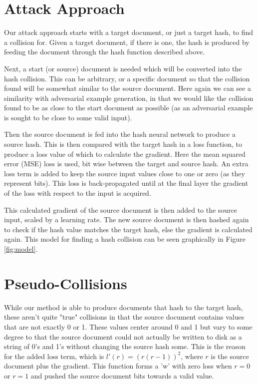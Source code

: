 \documentclass{article}
\begin{document}
\section{Attack Approach}

Our attack approach starts with a target document, or just a target hash, to
find a collision for. Given a target document, if there is one, the hash
is produced by feeding the document through the hash function described above.

Next, a start (or source) document is needed which will be converted into the
hash collision.  This can be arbitrary, or a specific document so that the
collision found will be somewhat similar to the source document. Here again we
can see a similarity with adversarial example generation, in that we would like
the collision found to be as close to the start document as possible (as an
adversarial example is sought to be close to some valid input).

Then the source document is fed into the hash neural network to produce a source hash.
This is then compared with the target hash in a loss function, to produce a loss
value of which to calculate the gradient. Here the mean squared error (MSE) loss
is used, bit wise between the target and source hash. An extra loss term is
added to keep the source input values close to one or zero (as they represent bits).
This loss is back-propagated until at the final layer the gradient of the loss
with respect to the input is acquired.

This calculated gradient of the source document is then added to the source
input, scaled by a learning rate. The new source document is then hashed again
to check if the hash value matches the target hash, else the gradient is
calculated again.  This model for finding a hash collision can be seen
graphically in Figure \ref{fig:model}.

\section*{Pseudo-Collisions}
While our method is able to produce documents that hash to the target hash, these
aren't quite "true" collisions in that the source document contains values that
are not exactly 0 or 1. These values center around 0 and 1 but vary to some degree
to that the source document could not actually be written to disk as a string of 0's
and 1's without changing the source hash some. This is the reason for the added
loss term, which is $l'(r) = (r (r - 1))^2$, where $r$ is the source document
plus the gradient. This function  forms a 'w' with zero loss when $r = 0$ or
$r = 1$ and pushed the source document bits towards a valid value.
\end{document}
